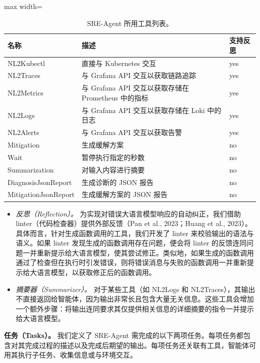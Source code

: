 \documentclass[10pt,UTF8,fontset=fandol]{ctexart}
\begin{document}
\begin{table}[H]
\centering
\caption{SRE-Agent 所用工具列表。}
\label{tab:itb-tab14}
\begin{adjustbox}{max width=\linewidth}
\begin{tabular}{lll}
\toprule
\textbf{名称} & \textbf{描述} & \textbf{支持反思} \\
\midrule
NL2Kubectl & 直接与 Kubernetes 交互 & yes \\
NL2Traces & 与 Grafana API 交互以获取链路追踪 & yes \\
NL2Metrics & 与 Grafana API 交互以获取存储在 Prometheus 中的指标 & yes \\
NL2Logs & 与 Grafana API 交互以获取存储在 Loki 中的日志 & yes \\
NL2Alerts & 与 Grafana API 交互以获取告警 & yes \\
Mitigation & 生成缓解方案 & no \\
Wait & 暂停执行指定的秒数 & no \\
Summarization & 对输入内容进行摘要 & no \\
DiagnosisJsonReport & 生成诊断的 JSON 报告 & no \\
MitigationJsonReport & 生成缓解方案的 JSON 报告 & no \\
\bottomrule
\end{tabular}
\end{adjustbox}
\end{table}

\begin{itemize}
\item \emph{反思（Reflection）。} 为实现对错误大语言模型响应的自动纠正，我们借助 linter（代码检查器）提供外部反馈（Pan et al., 2023；Huang et al., 2023）。具体而言，针对生成函数调用的工具，我们开发了 linter 来校验输出的语法与语义。如果 linter 发现生成的函数调用存在问题，便会将 linter 的反馈连同问题一并重新提示给大语言模型，使其尝试修正。类似地，如果生成的函数调用通过了检查但在执行时引发错误，则将错误消息与失败的函数调用一并重新提示给大语言模型，以获取修正后的函数调用。
\item \emph{摘要器（Summarizer）。} 对于某些工具（如 NL2Logs 和 NL2Traces），其输出不直接返回给智能体，因为输出非常长且包含大量无关信息。这些工具会增加一个额外步骤：将输出连同要求其仅提供相关信息的详细摘要的指令一并提示给大语言模型。
\end{itemize}

\textbf{任务（Tasks）。} 我们定义了 SRE-Agent 需完成的以下两项任务。每项任务都包含对其完成过程的描述以及完成后期望的输出。每项任务还关联有工具，智能体可用其执行子任务、收集信息或与环境交互。
\end{document}
